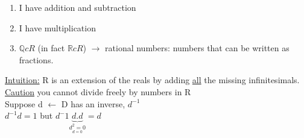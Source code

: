 \documentclass[a4paper, 12pt]{article}
\begin{document}
\begin{enumerate}
\begin{itemize}
\begin{enumerate}
\item I have addition and subtraction
\item I have multiplication
\item $\mathbb{Q} c R$ (in fact $\mathbb{R} c R $)
$\rightarrow$ rational numbers: numbers that can be written as fractions.\\
\end{enumerate}
\underline{Intuition:} R is an extension of the reals by adding \underline{all} the missing infinitesimals.\\
\underline{Caution} you cannot divide freely by numbers in R\\
Suppose d $\leftarrow$ D has an inverse, $d^{-1}$\\
${d^{-1}}{d} = 1$ but $d^-1\underbrace{d.d}_{\underset{d = 0}{d^2 = 0}} = d$
\end{itemize}
\end{enumerate}
\end{document}
